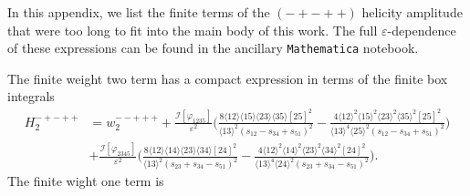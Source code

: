 \documentclass[11pt]{article}
\newcommand{\nn}{\nonumber}
\newcommand{\la}{\langle}
\newcommand{\ra}{\rangle}
\newcommand{\vphi}{\varphi}
\newcommand{\vep}{\varepsilon}
\begin{document}
In this appendix, we list the finite terms of the $(-+-++)$ helicity amplitude that were too long to fit into the main body of this work. The full $\vep$-dependence of these expressions can be found in the ancillary {\tt{Mathematica}} notebook.

The finite weight two term has a compact expression in terms of the finite box integrals
\begin{align}
	H_2^{-+-++} &= w_2^{--+++}
	+ \frac{\mathscr{I}[\vphi_{1235}]}{\vep^2}
	\bigg( 
		\frac{8 \la12\ra \la15\ra \la23\ra \la35\ra [25]^2}{\la13\ra^2 (s_{12}-s_{34}+s_{51})^2}
		- \frac{4 \la12\ra^2 \la15\ra^2 \la23\ra^2 \la35\ra^2 [25]^2}{\la13\ra^4 \la25\ra^2 (s_{12}-s_{34}+s_{51})^2}
	\bigg) 
	\nn\\&
	+ \frac{\mathscr{I}[\vphi_{2345}]}{\vep^2}
	\bigg(
		\frac{8 \la12\ra \la14\ra \la23\ra \la34\ra [24]^2}{ \la13\ra^2 (s_{23}+s_{34}-s_{51})^2}
		-\frac{4 \la12\ra^2 \la14\ra^2 \la23\ra^2 \la34\ra^2 [24]^2}{\la13\ra^4 \la24\ra^2 (s_{23}+s_{34}-s_{51})^2}
	\bigg). 
\end{align}
The finite wight one term is 
\end{document}
